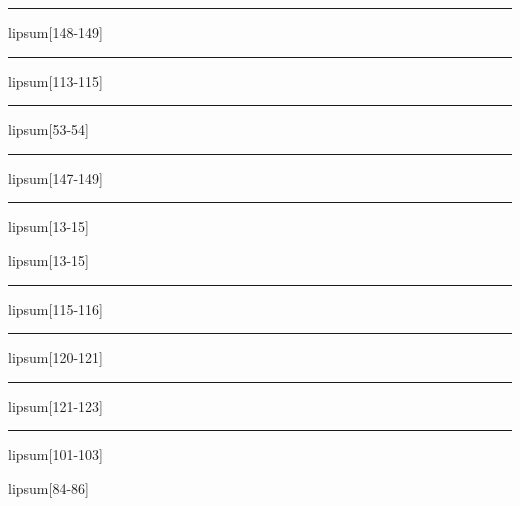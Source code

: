 \documentclass[11pt,a4paper]{article}
\begin{document}
\begin{simplewrap}
  \textcolor{orange!43}{\rule{5.3cm}{8.0cm}}
\end{simplewrap}
lipsum[148-149]

\begin{simplewrap}
  \textcolor{yellow!30}{\rule{3.6cm}{4.3cm}}
\end{simplewrap}
lipsum[113-115]

\begin{simplewrap}
  \textcolor{teal!19}{\rule{3.5cm}{2.9cm}}
\end{simplewrap}
lipsum[53-54]

\begin{simplewrap}
  \textcolor{magenta!30}{\rule{3.8cm}{9.5cm}}
\end{simplewrap}
lipsum[147-149]

\begin{simplewrap}
  \textcolor{green!29}{\rule{4.8cm}{4.7cm}}
\end{simplewrap}
lipsum[13-15]

lipsum[13-15]

\begin{simplewrap}
  \textcolor{orange!34}{\rule{3.2cm}{5.4cm}}
\end{simplewrap}
lipsum[115-116]

\begin{simplewrap}
  \textcolor{violet!31}{\rule{5.5cm}{7.7cm}}
\end{simplewrap}
lipsum[120-121]

\begin{simplewrap}
  \textcolor{green!54}{\rule{4.4cm}{5.6cm}}
\end{simplewrap}
lipsum[121-123]

\begin{simplewrap}
  \textcolor{magenta!19}{\rule{5.6cm}{6.9cm}}
\end{simplewrap}
lipsum[101-103]

lipsum[84-86]
\end{document}
